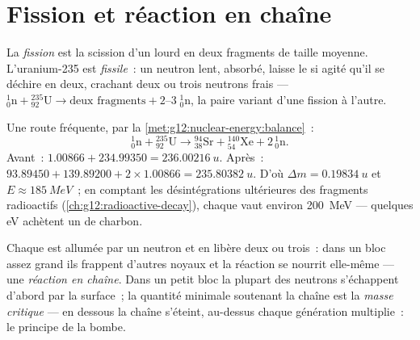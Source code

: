 \section{Fission et réaction en chaîne}

\begin{definition}[Fission]\label{def:g12:nuclear-energy:fission}
La \emph{fission} est la scission d'un
 lourd en deux fragments de taille
moyenne. L'uranium-235 est \emph{fissile}~: un neutron
lent, absorbé, laisse le  si agité qu'il
se déchire en deux, crachant deux ou trois neutrons frais ---
${}^{1}_{0}\mathrm{n} + {}^{235}_{92}\mathrm{U} \to \text{deux fragments} +
2\text{--}3\;{}^{1}_{0}\mathrm{n}$, la paire variant d'une fission à
l'autre.
\end{definition}

\begin{example}\label{ex:g12:nuclear-energy:fissionbalance}
Une route fréquente, par la \cref{met:g12:nuclear-energy:balance}~:
\[
{}^{1}_{0}\mathrm{n} + {}^{235}_{92}\mathrm{U} \longrightarrow
{}^{94}_{38}\mathrm{Sr} + {}^{140}_{54}\mathrm{Xe} + 2\,{}^{1}_{0}\mathrm{n}.
\]
Avant~: $1.00866 + 234.99350 = \qty{236.00216}{u}$. Après~:
$93.89450 + 139.89200 + 2 \times 1.00866 = \qty{235.80382}{u}$. D'où
$\Delta m = \qty{0.19834}{u}$ et $E \approx \qty{185}{MeV}$~; en
comptant les désintégrations ultérieures des fragments radioactifs
(\cref{ch:g12:radioactive-decay}), chaque
 vaut environ \qty{200}{MeV} --- quelques
\unit{eV} achètent un  de charbon.
\end{example}

\begin{definition}\label{def:g12:nuclear-energy:chain}
Chaque  est allumée par un neutron et en libère
deux ou trois~: dans un bloc assez grand ils frappent d'autres noyaux
et la réaction se nourrit elle-même --- une \emph{réaction en
chaîne}. Dans un petit bloc la plupart des
neutrons s'échappent d'abord par la surface~; la quantité minimale
soutenant la chaîne est la \emph{masse critique} --- en dessous la chaîne s'éteint, au-dessus chaque
génération multiplie~: le principe de la bombe.
\end{definition}

